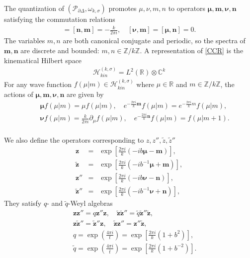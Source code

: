 \documentclass[aps,prd,notitlepage,nofootinbib,superscriptaddress,groupedaddress,twocolumn]{revtex4-1}
\def\C{\mathbb{C}}
\def\R{\mathbb{R}}
\def\be{\begin{eqnarray}}
\def\ee{\end{eqnarray}}
\newcommand{\ch}{\mathcal H}
\newcommand{\calp}{\mathcal P}
\newcommand{\sig}{\sigma}
\renewcommand{\o}{\omega}
\newcommand{\lt}{\left}
\newcommand{\rt}{\right}
\begin{document}
	
The quantization of $(\calp_{\partial\Delta},\o_{k,\sig})$ promotes $\mu,\nu,m,n$ to operators $\bm{\mu}, \mathbf{m} , \bm{\nu}, \mathbf{n}$ satisfying the commutation relations
\be
[\boldsymbol{\mu},\boldsymbol{\nu}]=[\mathbf{n},\mathbf{m}]=-\frac{k}{2 \pi i},  \quad[\boldsymbol{\nu}, \mathbf{m}]=[\boldsymbol{\mu}, \mathbf{n}]=0. \label{CCR}
\ee
The variables $m,n$ are both canonical conjugate and periodic, so the spectra of $\mathbf{m}, \mathbf{n}$ are discrete and bounded: $m,n\in \mathbb{Z}/k\mathbb{Z}$. A representation of \eqref{CCR} is the kinematical Hilbert space
\be
\ch^{(k,\sig)}_{kin}=L^2(\R)\otimes \C^k
\ee
For any wave function $f(\mu|m)\in \ch_{kin}^{(k,\sig)}$ where $\mu\in\R$ and $m\in\mathbb{Z}/k\mathbb{Z}$, the actions of $\bm{\mu}, \mathbf{m} , \bm{\nu}, \mathbf{n}$ are given by 
\be
&&\boldsymbol{\mu} f(\mu| m)=\mu f(\mu| m), \quad e^{-\frac{2 \pi i}{k} \mathbf{m}} f(\mu | m)=e^{-\frac{2 \pi i}{k} m} f(\mu| m), \nonumber\\
&&\boldsymbol{\nu} f(\mu| m)=\frac{k}{2 \pi i} \partial_{\mu} f(\mu| m), \quad e^{-\frac{2 \pi i}{k} \mathbf{n}} f(\mu| m)=f(\mu| m+1).\nonumber\\
\label{mumnunoperator}
\ee

We also define the operators corresponding to $z,z'',\widetilde{z},\widetilde{z}''$	
\be
\bm{z} &=&\exp\lt[ \frac{2 \pi i}{k}(-i b \boldsymbol{\mu}-\mathbf{m})\rt], \\
\widetilde{\bm{z}}&=&\exp\lt[ \frac{2 \pi i}{k}\left(-i b^{-1} \boldsymbol{\mu}+\mathbf{m}\right) \rt],\\
\bm{z}'' &=&\exp \lt[\frac{2 \pi i}{k}(-i b \boldsymbol{\nu}-\mathbf{n})\rt], \\
\widetilde{\bm{z}}''&=&\exp \lt[\frac{2 \pi i}{k}\left(-i b^{-1} \boldsymbol{\nu}+\mathbf{n}\right)\rt],
\ee
They satisfy $q$- and $\widetilde{q}$-Weyl algebras
\be
&&\bm{z}\bm{z}''=q\bm{z}''\bm{z}, \quad \widetilde{\bm{z}}\widetilde{\bm{z}}''=\widetilde{q}\widetilde{\bm{z}}''\widetilde{\bm{z}},\nonumber\\
&&\bm{z}\widetilde{\bm{z}}''=\widetilde{\bm{z}}''\bm{z},\quad \widetilde{\bm{z}}\bm{z}''=\bm{z}''\widetilde{\bm{z}},\nonumber\\
&&q=\exp \lt(\frac{4 \pi i}{t}\rt)=\exp\lt[\frac{2 \pi i}{k}\left(1+b^{2}\right)\rt], \\ 
&&\widetilde{q}=\exp \lt(\frac{4 \pi i}{\bar{t}}\rt)=\exp \lt[\frac{2 \pi i}{k}\left(1+b^{-2}\right)\rt].
\ee
\end{document}
